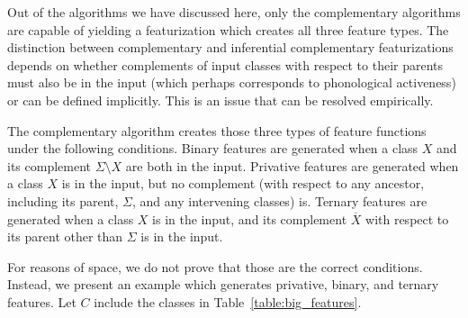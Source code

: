 \documentclass[12pt, oneside]{article}   	%
\begin{document}
Out of the algorithms we have discussed here, only the complementary algorithms are capable of yielding a featurization which creates all three feature types. The distinction between complementary and inferential complementary featurizations depends on whether complements of input classes with respect to their parents must also be in the input (which perhaps corresponds to phonological activeness) or can be defined implicitly. This is an issue that can be resolved empirically.

The complementary algorithm creates those three types of feature functions under the following conditions. Binary features are generated when a class $X$ and its complement $\Sigma \setminus X$ are both in the input. Privative features are generated when a class $X$ is in the input, but no complement (with respect to any ancestor, including its parent, $\Sigma$, and any intervening classes) is. Ternary features are generated when a class $X$ is in the input, and its complement $\overline{X}$ with respect to its parent other than $\Sigma$ is in the input.

For reasons of space, we do not prove that those are the correct conditions. Instead, we present an example which generates privative, binary, and ternary features. Let $C$ include the classes in Table~\ref{table:big_features}.
\end{document}
